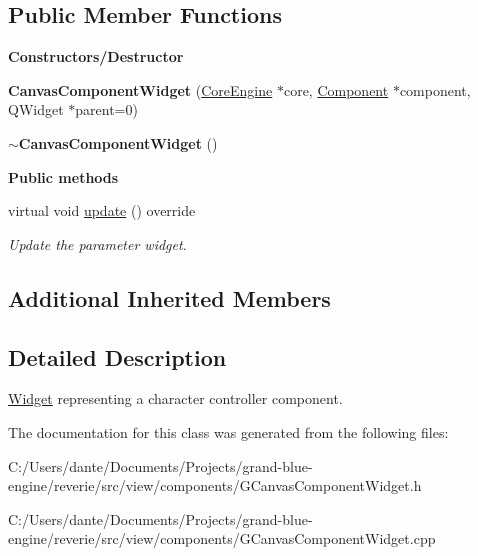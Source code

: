 \subsection*{Public Member Functions}
\begin{Indent}\textbf{ Constructors/\+Destructor}\par
\begin{DoxyCompactItemize}
\item 
\mbox{\label{classrev_1_1_view_1_1_canvas_component_widget_a185279f3cca8df4af1d1f20080f01e42}} 
{\bfseries Canvas\+Component\+Widget} (\mbox{\hyperlink{classrev_1_1_core_engine}{Core\+Engine}} $\ast$core, \mbox{\hyperlink{classrev_1_1_component}{Component}} $\ast$component, Q\+Widget $\ast$parent=0)
\item 
\mbox{\label{classrev_1_1_view_1_1_canvas_component_widget_a71cc2f0fd389c3204512a725b3a6a40e}} 
{\bfseries $\sim$\+Canvas\+Component\+Widget} ()
\end{DoxyCompactItemize}
\end{Indent}
\begin{Indent}\textbf{ Public methods}\par
\begin{DoxyCompactItemize}
\item 
\mbox{\label{classrev_1_1_view_1_1_canvas_component_widget_a0c6dd4c6256efd3d5479f9fb2c4fb76f}} 
virtual void \mbox{\hyperlink{classrev_1_1_view_1_1_canvas_component_widget_a0c6dd4c6256efd3d5479f9fb2c4fb76f}{update}} () override
\begin{DoxyCompactList}\small\item\em Update the parameter widget. \end{DoxyCompactList}\end{DoxyCompactItemize}
\end{Indent}
\subsection*{Additional Inherited Members}


\subsection{Detailed Description}
\mbox{\hyperlink{class_widget}{Widget}} representing a character controller component. 

The documentation for this class was generated from the following files\+:\begin{DoxyCompactItemize}
\item 
C\+:/\+Users/dante/\+Documents/\+Projects/grand-\/blue-\/engine/reverie/src/view/components/G\+Canvas\+Component\+Widget.\+h\item 
C\+:/\+Users/dante/\+Documents/\+Projects/grand-\/blue-\/engine/reverie/src/view/components/G\+Canvas\+Component\+Widget.\+cpp\end{DoxyCompactItemize}
